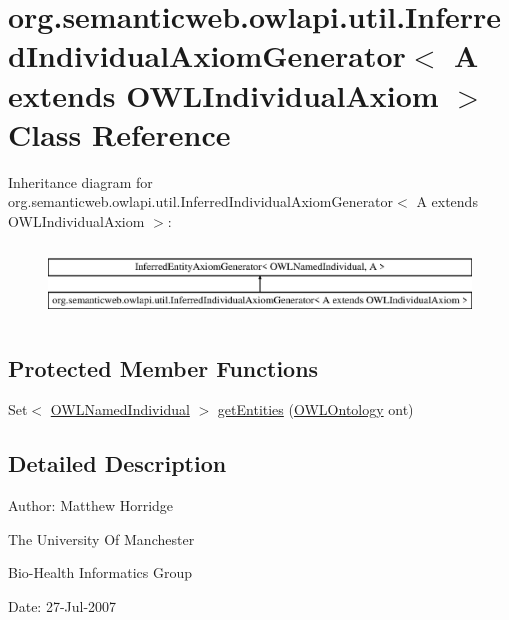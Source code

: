 \hypertarget{classorg_1_1semanticweb_1_1owlapi_1_1util_1_1_inferred_individual_axiom_generator_3_01_a_01exten2bffc9bdb7d503a66dc382eefad30b9e}{\section{org.\-semanticweb.\-owlapi.\-util.\-Inferred\-Individual\-Axiom\-Generator$<$ A extends O\-W\-L\-Individual\-Axiom $>$ Class Reference}
\label{classorg_1_1semanticweb_1_1owlapi_1_1util_1_1_inferred_individual_axiom_generator_3_01_a_01exten2bffc9bdb7d503a66dc382eefad30b9e}
}
Inheritance diagram for org.\-semanticweb.\-owlapi.\-util.\-Inferred\-Individual\-Axiom\-Generator$<$ A extends O\-W\-L\-Individual\-Axiom $>$\-:\begin{figure}[H]
\begin{center}
\leavevmode
\includegraphics[height=1.961471cm]{classorg_1_1semanticweb_1_1owlapi_1_1util_1_1_inferred_individual_axiom_generator_3_01_a_01exten2bffc9bdb7d503a66dc382eefad30b9e}
\end{center}
\end{figure}
\subsection*{Protected Member Functions}
\begin{DoxyCompactItemize}
\item 
Set$<$ \hyperlink{interfaceorg_1_1semanticweb_1_1owlapi_1_1model_1_1_o_w_l_named_individual}{O\-W\-L\-Named\-Individual} $>$ \hyperlink{classorg_1_1semanticweb_1_1owlapi_1_1util_1_1_inferred_individual_axiom_generator_3_01_a_01exten2bffc9bdb7d503a66dc382eefad30b9e_ac1f5d9f16e8d2820a25654a9a7e5a7ab}{get\-Entities} (\hyperlink{interfaceorg_1_1semanticweb_1_1owlapi_1_1model_1_1_o_w_l_ontology}{O\-W\-L\-Ontology} ont)
\end{DoxyCompactItemize}


\subsection{Detailed Description}
Author\-: Matthew Horridge\par
 The University Of Manchester\par
 Bio-\/\-Health Informatics Group\par
 Date\-: 27-\/\-Jul-\/2007\par
\par
 
